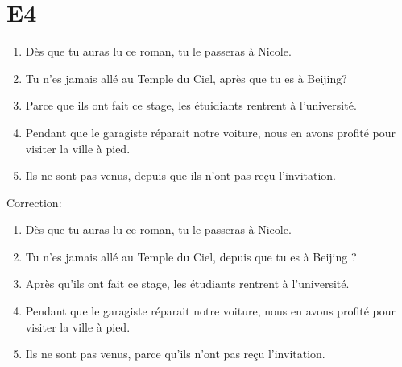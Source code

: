 \documentclass{book}
\begin{document}
    \section{E4}
        \begin{enumerate}
            \item Dès que tu auras lu ce roman, tu le passeras à Nicole.
            \item Tu n'es jamais allé au Temple du Ciel, après que tu es à Beijing?
            \item Parce que ils ont fait ce stage, les étuidiants rentrent à l'université.
            \item Pendant que le garagiste réparait notre voiture, nous en avons profité pour visiter la ville à pied.
            \item Ils ne sont pas venus, depuis que ils n'ont pas reçu l'invitation.
        \end{enumerate}
        Correction:
        \begin{enumerate}
            \item Dès que tu auras lu ce roman, tu le passeras à Nicole.
            \item Tu n'es jamais allé au Temple du Ciel, depuis que tu es à Beijing ?
            \item Après qu'ils ont fait ce stage, les étudiants rentrent à l'université.
            \item Pendant que le garagiste réparait notre voiture, nous en avons profité pour visiter la ville à pied.
            \item Ils ne sont pas venus, parce qu'ils n'ont pas reçu l'invitation.
        \end{enumerate}
\end{document}
